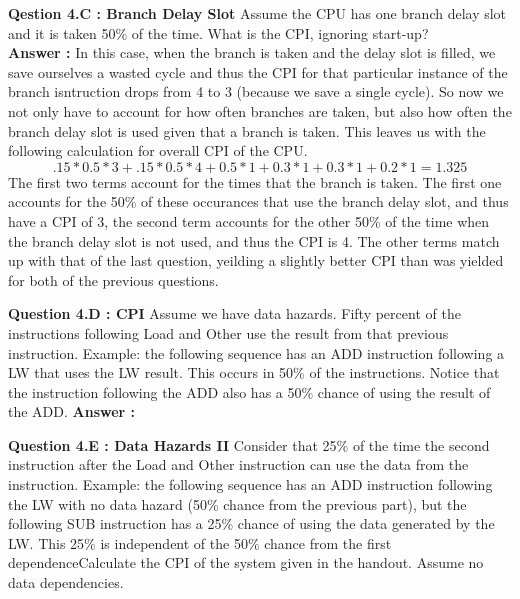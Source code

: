 \documentclass[a4paper,11pt]{article}
\newcommand{\answer}{\textbf{Answer : }}
\begin{document}
\item \textbf{Qestion 4.C : Branch Delay Slot} Assume the CPU has one branch delay slot and it is taken 50\% of the time. What is the CPI, ignoring start-up? \\
  \answer In this case, when the branch is taken and the delay slot is filled, we save ourselves a wasted cycle and thus the CPI for that particular instance of the branch isntruction drops from 4 to 3 (because we save a single cycle). So now we not only have to account for how often branches are taken, but also how often the branch delay slot is used given that a branch is taken. This leaves us with the following calculation for overall CPI of the CPU. 
  $$ .15*0.5*3+.15*0.5*4 + 0.5*1 +0.3*1+0.3*1+0.2*1 = 1.325$$
  The first two terms account for the times that the branch is taken. The first one accounts for the 50\% of these occurances that use the branch delay slot, and thus have a CPI of 3, the second term accounts for the other 50\% of the time when the branch delay slot is not used, and thus the CPI is 4. The other terms match up with that of the last question, yeilding a slightly better CPI than was yielded for both of the previous questions. 



\item \textbf{Question 4.D : CPI} Assume we have data hazards. Fifty percent of the instructions following Load and Other use the result from that previous instruction. Example: the following sequence has an ADD instruction following a LW that uses the LW result. This occurs in 50\% of the instructions. Notice that the instruction following the ADD also has a 50\% chance of using the result of the ADD.
\answer



\item \textbf{Question 4.E : Data Hazards II} Consider that 25\% of the time the second instruction after the Load and Other instruction can use the data from the instruction. Example: the following sequence has an ADD instruction following the LW with no data hazard (50\% chance from the previous part), but the following SUB instruction has a 25\% chance of using the data generated by the LW. This 25\% is independent of the 50\% chance from the first dependenceCalculate the CPI of the system given in the handout. Assume no data dependencies. \\
 
\end{document}

